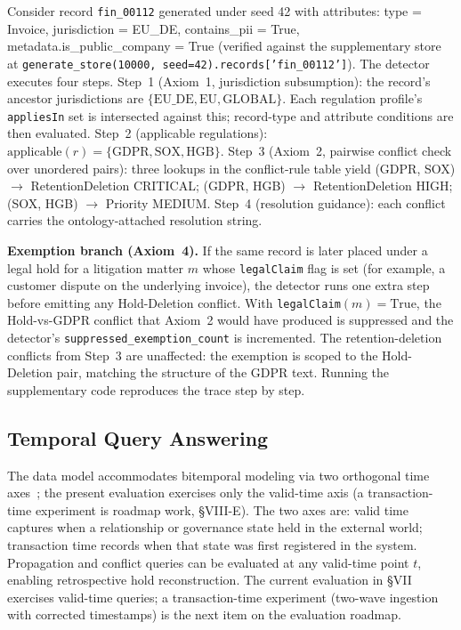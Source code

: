 \documentclass{ieeeaccess}
\begin{document}
Consider record \texttt{fin\_00112} generated under seed 42 with attributes: type = Invoice, jurisdiction = EU\_DE, contains\_pii = True, metadata.is\_public\_company = True (verified against the supplementary store at \texttt{generate\_store(10000, seed=42).records['fin\_00112']}). The detector executes four steps. Step~1 (Axiom~1, jurisdiction subsumption): the record's ancestor jurisdictions are $\{\mathrm{EU\_DE, EU, GLOBAL}\}$. Each regulation profile's \texttt{appliesIn} set is intersected against this; record-type and attribute conditions are then evaluated. Step~2 (applicable regulations): $\mathrm{applicable}(r) = \{\mathrm{GDPR, SOX, HGB}\}$. Step~3 (Axiom~2, pairwise conflict check over unordered pairs): three lookups in the conflict-rule table yield (GDPR, SOX) $\rightarrow$ RetentionDeletion CRITICAL; (GDPR, HGB) $\rightarrow$ RetentionDeletion HIGH; (SOX, HGB) $\rightarrow$ Priority MEDIUM. Step~4 (resolution guidance): each conflict carries the ontology-attached resolution string.

\textbf{Exemption branch (Axiom~4).} If the same record is later placed under a legal hold for a litigation matter $m$ whose \texttt{legalClaim} flag is set (for example, a customer dispute on the underlying invoice), the detector runs one extra step before emitting any Hold-Deletion conflict. With \texttt{legalClaim}$(m){=}\mathrm{True}$, the Hold-vs-GDPR conflict that Axiom~2 would have produced is suppressed and the detector's \texttt{suppressed\_exemption\_count} is incremented. The retention-deletion conflicts from Step~3 are unaffected: the exemption is scoped to the Hold-Deletion pair, matching the structure of the GDPR text. Running the supplementary code reproduces the trace step by step.

\subsection{Temporal Query Answering}

The data model accommodates bitemporal modeling via two orthogonal time axes~\cite{snodgrass1995,jensen1997}; the present evaluation exercises only the valid-time axis (a transaction-time experiment is roadmap work, §VIII-E). The two axes are: valid time captures when a relationship or governance state held in the external world; transaction time records when that state was first registered in the system. Propagation and conflict queries can be evaluated at any valid-time point $t$, enabling retrospective hold reconstruction. The current evaluation in §VII exercises valid-time queries; a transaction-time experiment (two-wave ingestion with corrected timestamps) is the next item on the evaluation roadmap.
\end{document}
